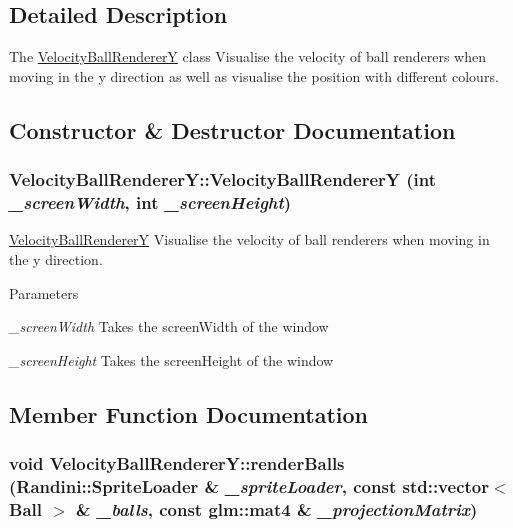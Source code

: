 \subsection{Detailed Description}
The \hyperlink{classVelocityBallRendererY}{VelocityBallRendererY} class Visualise the velocity of ball renderers when moving in the y direction as well as visualise the position with different colours. 

\subsection{Constructor \& Destructor Documentation}
\hypertarget{classVelocityBallRendererY_a7eb5545ad69050dd7bd06f014d1ecb85}{
\subsubsection[{VelocityBallRendererY}]{\setlength{\rightskip}{0pt plus 5cm}VelocityBallRendererY::VelocityBallRendererY (int {\em \_\-screenWidth}, \/  int {\em \_\-screenHeight})}}
\label{classVelocityBallRendererY_a7eb5545ad69050dd7bd06f014d1ecb85}


\hyperlink{classVelocityBallRendererY}{VelocityBallRendererY} Visualise the velocity of ball renderers when moving in the y direction. 
\begin{DoxyParams}{Parameters}
\item[{\em \_\-screenWidth}]Takes the screenWidth of the window \item[{\em \_\-screenHeight}]Takes the screenHeight of the window \end{DoxyParams}


\subsection{Member Function Documentation}
\hypertarget{classVelocityBallRendererY_ac519caa863fba74226b6733dbe033b59}{
\subsubsection[{renderBalls}]{\setlength{\rightskip}{0pt plus 5cm}void VelocityBallRendererY::renderBalls ({\bf Randini::SpriteLoader} \& {\em \_\-spriteLoader}, \/  const std::vector$<$ {\bf Ball} $>$ \& {\em \_\-balls}, \/  const glm::mat4 \& {\em \_\-projectionMatrix})}}
\label{classVelocityBallRendererY_ac519caa863fba74226b6733dbe033b59}


